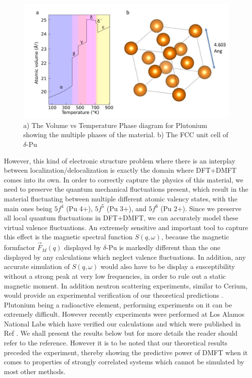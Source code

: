\documentclass[10pt]{ruthesis}
\begin{document}
{\begin{figure}[H]
\begin{center}
\includegraphics[width=\columnwidth]{Pu_phase_and_struct.jpg}
\caption{ a) The Volume vs Temperature Phase diagram for Plutonium showing the multiple phases of the material. b) The FCC unit cell of $\delta$-Pu \label{Pu_phase}}

\end{center}
\end{figure}

However, this kind of electronic structure problem where there is an interplay between localization/delocalization is exactly the domain where DFT+DMFT comes into its own. In order to correctly capture the physics of this material, we need to preserve the quantum mechanical fluctuations present, which result in the material fluctuating between multiple different atomic valency states, with the main ones being $5f^4$ (Pu 4+), $5f^5$ (Pu 3+), and $5f^6$ (Pu 2+). Since we preserve all local quantum fluctuations in DFT+DMFT, we can accurately model these virtual valence fluctuations. An extremely sensitive and important tool to capture this effect is the magnetic spectral function $S(q,\omega)$, because the magnetic formfactor $\vec{F}_M(q)$ displayed by $\delta$-Pu is markedly different than the one displayed by any calculations which neglect valence fluctuations. In addition, any accurate simulation of $S(q,\omega)$ would also have to be display a susceptibility without a strong peak at very low frequencies, in order to rule out a static magnetic moment. In addition neutron scattering experiments, similar to Cerium, would provide an experimental verification of our theoretical predictions  . Plutonium being a radioactive element, performing experiments on it can be extremely difficult. However recently experiments were performed at Los Alamos National Labs which have verified our calculations and which were published in Ref \cite{Me_Pu}. We shall present the results below but for more details the reader should refer to the reference. However it is to be noted that our theoretical results preceded the experiment, thereby showing the predictive power of DMFT when it comes to properties of strongly correlated systems which cannot be simulated by most other methods.


}
\end{document}

